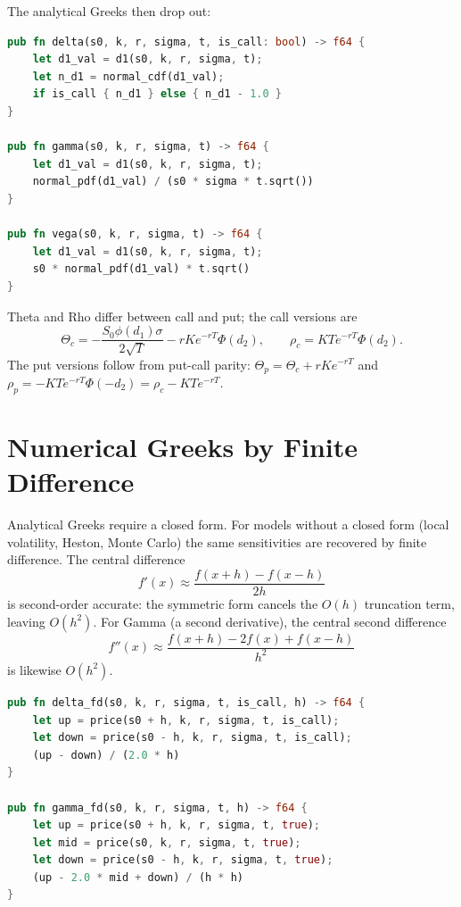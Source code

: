 The analytical Greeks then drop out:

\begin{lstlisting}[language=Rust]
pub fn delta(s0, k, r, sigma, t, is_call: bool) -> f64 {
    let d1_val = d1(s0, k, r, sigma, t);
    let n_d1 = normal_cdf(d1_val);
    if is_call { n_d1 } else { n_d1 - 1.0 }
}

pub fn gamma(s0, k, r, sigma, t) -> f64 {
    let d1_val = d1(s0, k, r, sigma, t);
    normal_pdf(d1_val) / (s0 * sigma * t.sqrt())
}

pub fn vega(s0, k, r, sigma, t) -> f64 {
    let d1_val = d1(s0, k, r, sigma, t);
    s0 * normal_pdf(d1_val) * t.sqrt()
}
\end{lstlisting}

Theta and Rho differ between call and put; the call versions are
\[
\Theta_c = -\frac{S_0 \phi(d_1) \sigma}{2\sqrt{T}} - r K e^{-rT} \Phi(d_2),
\qquad
\rho_c = K T e^{-rT} \Phi(d_2).
\]
The put versions follow from put-call parity:
$\Theta_p = \Theta_c + r K e^{-rT}$ and
$\rho_p = -K T e^{-rT} \Phi(-d_2) = \rho_c - K T e^{-rT}$.

\section{Numerical Greeks by Finite Difference}


Analytical Greeks require a closed form. For models without a closed form
(local volatility, Heston, Monte Carlo) the same sensitivities are
recovered by finite difference. The central difference
\[
f'(x) \approx \frac{f(x+h) - f(x-h)}{2h}
\]
is second-order accurate: the symmetric form cancels the $O(h)$
truncation term, leaving $O(h^2)$. For Gamma (a second derivative), the
central second difference
\[
f''(x) \approx \frac{f(x+h) - 2 f(x) + f(x-h)}{h^2}
\]
is likewise $O(h^2)$.

\begin{lstlisting}[language=Rust]
pub fn delta_fd(s0, k, r, sigma, t, is_call, h) -> f64 {
    let up = price(s0 + h, k, r, sigma, t, is_call);
    let down = price(s0 - h, k, r, sigma, t, is_call);
    (up - down) / (2.0 * h)
}

pub fn gamma_fd(s0, k, r, sigma, t, h) -> f64 {
    let up = price(s0 + h, k, r, sigma, t, true);
    let mid = price(s0, k, r, sigma, t, true);
    let down = price(s0 - h, k, r, sigma, t, true);
    (up - 2.0 * mid + down) / (h * h)
}
\end{lstlisting}

